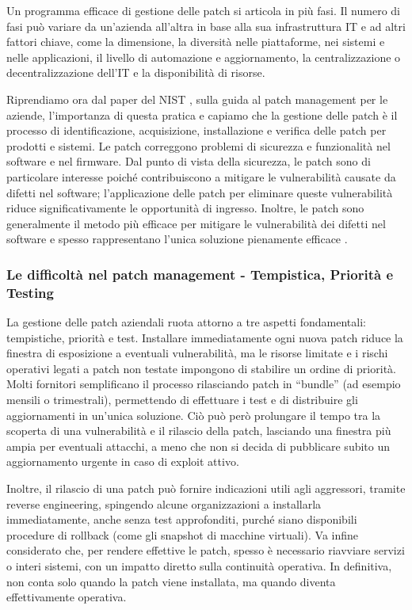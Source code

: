         Un programma efficace di gestione delle patch si articola in più fasi. Il numero di fasi può variare da un'azienda all'altra in base alla sua infrastruttura IT e ad altri fattori chiave, come la dimensione, la diversità nelle piattaforme, nei sistemi e nelle applicazioni, il livello di automazione e aggiornamento, la centralizzazione o decentralizzazione dell'IT e la disponibilità di risorse.
        
        Riprendiamo ora dal paper del NIST \cite{nist_patch_management}, sulla guida al patch management per le aziende, l'importanza di questa pratica e capiamo che la gestione delle patch è il processo di identificazione, acquisizione, installazione e verifica delle patch per prodotti e sistemi. Le patch correggono problemi di sicurezza e funzionalità nel software e nel firmware. Dal punto di vista della sicurezza, le patch sono di particolare interesse poiché contribuiscono a mitigare le vulnerabilità causate da difetti nel software; l'applicazione delle patch per eliminare queste vulnerabilità riduce significativamente le opportunità di ingresso. Inoltre, le patch sono generalmente il metodo più efficace per mitigare le vulnerabilità dei difetti nel software e spesso rappresentano l'unica soluzione pienamente efficace \cite{nist_patch_management}.

\newpage

            \subsubsection{Le difficoltà nel patch management - Tempistica, Priorità e Testing}

                La gestione delle patch aziendali ruota attorno a tre aspetti fondamentali: tempistiche, priorità e test. Installare immediatamente ogni nuova patch riduce la finestra di esposizione a eventuali vulnerabilità, ma le risorse limitate e i rischi operativi legati a patch non testate impongono di stabilire un ordine di priorità. Molti fornitori semplificano il processo rilasciando patch in “bundle” (ad esempio mensili o trimestrali), permettendo di effettuare i test e di distribuire gli aggiornamenti in un'unica soluzione. Ciò può però prolungare il tempo tra la scoperta di una vulnerabilità e il rilascio della patch, lasciando una finestra più ampia per eventuali attacchi, a meno che non si decida di pubblicare subito un aggiornamento urgente in caso di exploit attivo.

                Inoltre, il rilascio di una patch può fornire indicazioni utili agli aggressori, tramite reverse engineering, spingendo alcune organizzazioni a installarla immediatamente, anche senza test approfonditi, purché siano disponibili procedure di rollback (come gli snapshot di macchine virtuali). Va infine considerato che, per rendere effettive le patch, spesso è necessario riavviare servizi o interi sistemi, con un impatto diretto sulla continuità operativa. In definitiva, non conta solo quando la patch viene installata, ma quando diventa effettivamente operativa.

